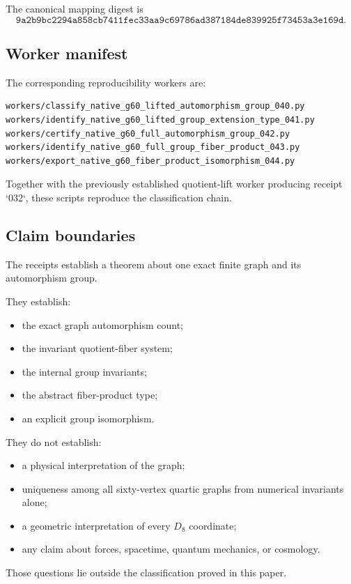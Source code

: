 The canonical mapping digest is
\[
\texttt{9a2b9bc2294a858cb7411fec33aa9c69786ad387184de839925f73453a3e169d}.
\]

\subsection{Worker manifest}

The corresponding reproducibility workers are:

\begin{verbatim}
workers/classify_native_g60_lifted_automorphism_group_040.py
workers/identify_native_g60_lifted_group_extension_type_041.py
workers/certify_native_g60_full_automorphism_group_042.py
workers/identify_native_g60_full_group_fiber_product_043.py
workers/export_native_g60_fiber_product_isomorphism_044.py
\end{verbatim}

Together with the previously established quotient-lift worker producing
receipt `032`, these scripts reproduce the classification chain.

\subsection{Claim boundaries}

The receipts establish a theorem about one exact finite graph and its
automorphism group.

They establish:

\begin{itemize}
\item the exact graph automorphism count;
\item the invariant quotient-fiber system;
\item the internal group invariants;
\item the abstract fiber-product type;
\item an explicit group isomorphism.
\end{itemize}

They do not establish:

\begin{itemize}
\item a physical interpretation of the graph;
\item uniqueness among all sixty-vertex quartic graphs from numerical
invariants alone;
\item a geometric interpretation of every $D_8$ coordinate;
\item any claim about forces, spacetime, quantum mechanics, or
cosmology.
\end{itemize}

Those questions lie outside the classification proved in this paper.
